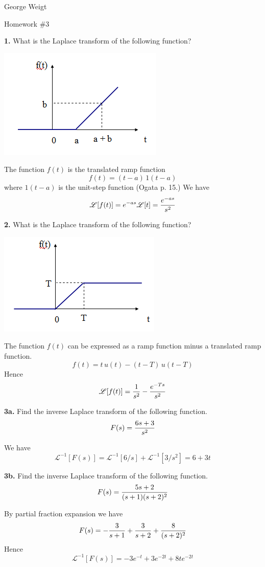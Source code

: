 \documentclass[11pt]{report}
\begin{document}
\noindent
George Weigt

\noindent
Homework \#3

\bigskip
\noindent
{\bf 1.} What is the Laplace transform of the following function?
\begin{center}
\includegraphics[scale=0.5]{images/211-1.png}
\end{center}

\bigskip
\noindent
The function $f(t)$ is the translated ramp function
$$f(t)=(t-a)\,1(t-a)$$
where $1(t-a)$ is the unit-step function (Ogata
p. 15.)
We have
$${\mathscr L}[f(t)]=e^{-as}{\mathscr L}[t]={e^{-as}\over s^2}$$

\bigskip
\noindent
{\bf 2.} What is the Laplace transform of the following function?
\begin{center}
\includegraphics[scale=0.5]{images/211-2.png}
\end{center}

\bigskip
\noindent
The function $f(t)$ can be expressed as a ramp function minus a translated ramp
function.
$$f(t)=t\,u(t)-(t-T)\,u(t-T)$$
Hence
$${\mathscr L}[f(t)]={1\over s^2}-{e^{-Ts}\over s^2}$$

\newpage

\bigskip
\noindent
{\bf 3a.} Find the inverse Laplace transform of the following function.
$$F(s)={6s+3\over s^2}$$

\bigskip
\noindent
We have
$${\mathscr L}^{-1}[F(s)]={\mathscr L}^{-1}[6/s]
+{\mathscr L}^{-1}[3/s^2]=6+3t$$

\bigskip
\noindent
{\bf 3b.} Find the inverse Laplace transform of the following function.
$$F(s)={5s+2\over(s+1)(s+2)^2}$$

\bigskip
\noindent
By partial fraction expansion we have
$$F(s)=-{3\over s+1}+{3\over s+2}+{8\over(s+2)^2}$$
Hence
$${\mathscr L}^{-1}[F(s)]=-3e^{-t}+3e^{-2t}+8te^{-2t}$$
\end{document}
